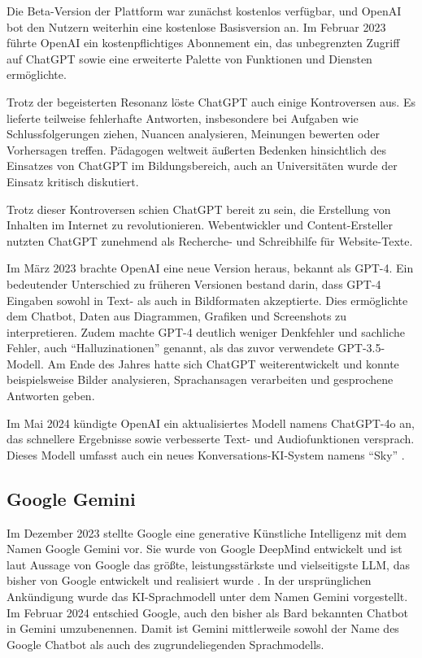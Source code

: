 Die Beta-Version der Plattform war zunächst kostenlos verfügbar, und OpenAI bot den Nutzern weiterhin eine kostenlose 
Basisversion an. Im Februar 2023 führte OpenAI ein kostenpflichtiges Abonnement ein, das unbegrenzten Zugriff auf ChatGPT 
sowie eine erweiterte Palette von Funktionen und Diensten ermöglichte.

Trotz der begeisterten Resonanz löste ChatGPT auch einige Kontroversen aus. Es lieferte teilweise fehlerhafte Antworten, 
insbesondere bei Aufgaben wie Schlussfolgerungen ziehen, Nuancen analysieren, Meinungen bewerten oder Vorhersagen treffen. 
Pädagogen weltweit äußerten Bedenken hinsichtlich des Einsatzes von ChatGPT im Bildungsbereich, auch an Universitäten wurde 
der Einsatz kritisch diskutiert.

Trotz dieser Kontroversen schien ChatGPT bereit zu sein, die Erstellung von Inhalten im Internet zu revolutionieren. 
Webentwickler und Content-Ersteller nutzten ChatGPT zunehmend als Recherche- und Schreibhilfe für Website-Texte.

Im März 2023 brachte OpenAI eine neue Version heraus, bekannt als GPT-4. Ein bedeutender Unterschied zu früheren Versionen 
bestand darin, dass GPT-4 Eingaben sowohl in Text- als auch in Bildformaten akzeptierte. Dies ermöglichte dem Chatbot, Daten 
aus Diagrammen, Grafiken und Screen\-shots zu interpretieren. Zudem machte GPT-4 deutlich weniger Denkfehler und sachliche Fehler, 
auch ``Halluzinationen'' genannt, als das zuvor verwendete GPT-3.5-Modell. Am Ende des Jahres hatte sich ChatGPT weiterentwickelt 
und konnte beispielsweise Bilder analysieren, Sprachansagen verarbeiten und gesprochene Antworten geben.

Im Mai 2024 kündigte OpenAI ein aktualisiertes Modell namens ChatGPT-4o an, das schnellere Ergebnisse sowie verbesserte 
Text- und Audiofunktionen versprach. Dieses Modell umfasst auch ein neues Konversations-KI-System namens ``Sky'' \cite{GrundlagenChatGPT}.

\subsection{Google Gemini}  \label{Google Gemini}

Im Dezember 2023 stellte Google eine generative Künstliche Intelligenz mit dem Namen Google Gemini vor. Sie wurde von Google DeepMind 
entwickelt und ist laut Aussage von Google das größte, leistungsstärkste und vielseitigste LLM, das bisher von 
Google entwickelt und realisiert wurde \cite{GeminiGroeßteModell}. In der ursprünglichen Ankündigung wurde das KI-Sprachmodell unter dem Namen Gemini vorgestellt. 
Im Februar 2024 entschied Google, auch den bisher als Bard bekannten Chatbot in Gemini umzubenennen. Damit ist Gemini mittlerweile sowohl
der Name des Google Chatbot als auch des zugrundeliegenden Sprachmodells. 

